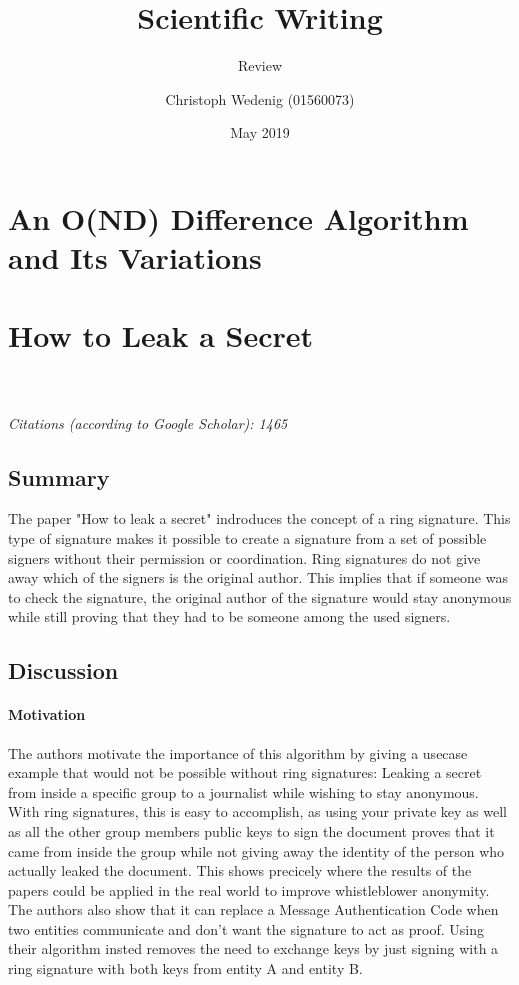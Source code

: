 \documentclass{scrartcl}
\title{Scientific Writing}
\subtitle{Review}
\author{Christoph Wedenig (01560073)}
\date{May 2019}
\begin{document}
\maketitle

\section{An O(ND) Difference Algorithm and Its Variations}


\section{How to Leak a Secret}
\\\\
\emph{Citations (according to Google Scholar): 1465}
\subsection{Summary}
The paper "How to leak a secret" \cite{rivest2001leak} indroduces the concept of a ring signature. This type of signature makes it possible to create a signature from a set of possible signers without their permission or coordination. Ring signatures do not give away which of the signers is the original author.  This implies that if someone was to check the signature, the original author of the signature would stay anonymous while still proving that they had to be someone among the used signers. %

\subsection{Discussion}
\paragraph{Motivation}{
The authors motivate the importance of this algorithm by giving a usecase example that would not be possible without ring signatures: Leaking a secret from inside a specific group to a journalist while wishing to stay anonymous. With ring signatures, this is easy to accomplish, as using your private key as well as all the other group members public keys to sign the document proves that it came from inside the group while not giving away the identity of the person who actually leaked the document. This shows precicely where the results of the papers could be applied in the real world to improve whistleblower anonymity. The authors also show that it can replace a Message Authentication Code when two entities communicate and don't want the signature to act as proof. Using their algorithm insted removes the need to exchange keys by just signing with a ring signature with both keys from entity A and entity B.
}
\end{document}

